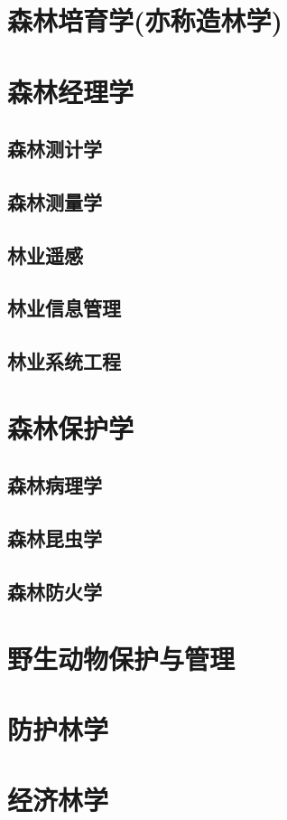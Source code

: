 \documentclass[UTF8]{../ApplicationUniverse}
\begin{document}
\chapter{森林培育学(亦称造林学)}

\chapter{森林经理学}
\section{森林测计学}
\section{森林测量学}
\section{林业遥感}
\section{林业信息管理}
\section{林业系统工程}


\chapter{森林保护学}
\section{森林病理学}
\section{森林昆虫学}
\section{森林防火学}

\chapter{野生动物保护与管理}
\chapter{防护林学}
\chapter{经济林学}
\end{document}

